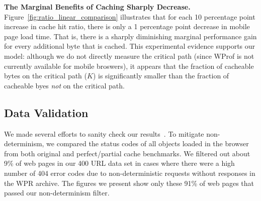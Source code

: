 {\bf The Marginal Benefits of Caching Sharply Decrease.}
Figure~\ref{fig:ratio_linear_comparison} illustrates that for each 10 percentage point increase in cache hit ratio, there is only
a 1 percentage point decrease in mobile page load time.
That is, there is a sharply diminishing marginal performance gain for 
every additional byte that is cached.
This experimental evidence supports our model:
although we do not directly measure the critical path (since WProf is not currently available for mobile broswers), it appears that the fraction of cacheable bytes on the critical path ($K$) is
significantly smaller than the fraction of cacheable byes {\it not} on
the critical path.

% 


\subsection{Data Validation}
\label{subsec:validation}
We made several efforts to sanity check our results~\cite{sanity-checks}. To
mitigate non-determinism, we compared the status codes of all objects loaded
in the browser from both original and perfect/partial cache benchmarks. We
filtered out about 9\% of web pages in our 400 URL data set in cases where
there were a high number of 404 error codes due to non-deterministic requests
without responses in the WPR archive. The figures we present show only these
91\% of web pages that passed our non-determinism filter.

